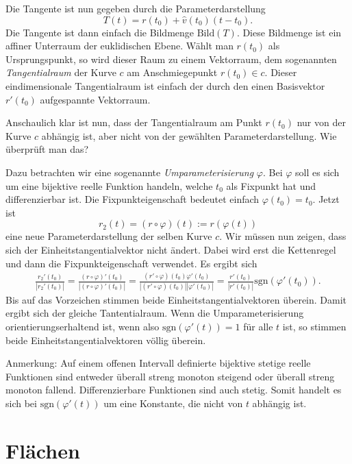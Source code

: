\documentclass[a4paper,12pt,fleqn]{article}
\begin{document}
Die Tangente ist nun gegeben durch die Parameterdarstellung
\begin{equation}
T(t) = r(t_0)+\hat v(t_0)(t-t_0).
\end{equation}
Die Tangente ist dann einfach die Bildmenge \(\mathrm{Bild}(T)\).
Diese Bildmenge ist ein affiner Unterraum der euklidischen
Ebene. Wählt man \(r(t_0)\) als Ursprungspunkt, so wird dieser Raum
zu einem Vektorraum, dem sogenannten \textit{Tangentialraum} der
Kurve \(c\) am Anschmiegepunkt \(r(t_0)\in c\). Dieser
eindimensionale Tangentialraum ist einfach der durch den
einen Basisvektor \(r'(t_0)\) aufgespannte Vektorraum.

Anschaulich klar ist nun, dass der Tangentialraum am Punkt \(r(t_0)\)
nur von der Kurve \(c\) abhängig ist, aber nicht von der gewählten
Parameterdarstellung. Wie überprüft man das?

Dazu betrachten wir eine sogenannte \textit{Umparameterisierung}
\(\varphi\). Bei \(\varphi\) soll es sich um eine bijektive
reelle Funktion handeln, welche \(t_0\) als Fixpunkt hat und
differenzierbar ist. Die Fixpunkteigenschaft bedeutet einfach
\(\varphi(t_0)=t_0\). Jetzt ist
\begin{equation}
r_2(t) = (r\circ\varphi)(t):=r(\varphi(t))
\end{equation}
eine neue Parameterdarstellung der selben Kurve \(c\).
Wir müssen nun zeigen, dass sich der Einheitstangentialvektor
nicht ändert. Dabei wird erst die Kettenregel und dann die
Fixpunkteigenschaft verwendet. Es ergibt sich
\begin{gather*}
\frac{r_2'(t_0)}{|r_2'(t_0)|}
= \frac{(r\circ\varphi)'(t_0)}{|(r\circ\varphi)'(t_0)|}
= \frac{(r'\circ\varphi)(t_0)\varphi'(t_0)}{|(r'\circ\varphi)(t_0)||\varphi'(t_0)|}
= \frac{r'(t_0)}{|r'(t_0)|} \mathrm{sgn}(\varphi'(t_0)).
\end{gather*}
Bis auf das Vorzeichen stimmen beide Einheitstangentialvektoren
überein. Damit ergibt sich der gleiche Tantentialraum. Wenn die
Umparameterisierung orientierungserhaltend ist, wenn also
\(\mathrm{sgn}(\varphi'(t))=1\) für alle \(t\) ist, so stimmen
beide Einheitstangentialvektoren völlig überein.

Anmerkung: Auf einem offenen Intervall definierte bijektive
stetige reelle
Funktionen sind entweder überall streng monoton steigend oder überall
streng monoton fallend. Differenzierbare Funktionen sind auch stetig.
Somit handelt es sich bei \(\mathrm{sgn}(\varphi'(t))\) um eine
Konstante, die nicht von \(t\) abhängig ist.

\section{Flächen}
\end{document}

